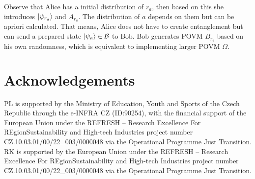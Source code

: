 \documentclass[12pt,a4paper,reqno, aps, superscriptaddress]{amsart}
\newcommand{\BB}{\ensuremath{\mathcal{B}}}
\begin{document}
Observe that Alice has a initial distribution of $r_a$, then based on this she introduces $\ket{\psi_{r_a}}$ and $A_{r_a}$. The distribution of $a$ depends on them but can be apriori calculated. That means, Alice does not have to create entanglement but can send a prepared state $\ket{\psi_{a}} \in \BB $ to Bob.
Bob generates POVM $B_{r_b}$ based on his own randomness, which is equivalent to implementing larger POVM $\Omega$. 


 
\section*{Acknowledgements}

  PL is supported by the Ministry of Education, Youth and Sports of the Czech Republic through the e-INFRA CZ (ID:90254), with the financial support of the European Union under the REFRESH – Research Excellence For REgionSustainability and
High-tech Industries project number CZ.10.03.01/00/22\_003/0000048 via the Operational Programme Just Transition.  
RK is supported by the European Union under the REFRESH – Research Excellence For REgionSustainability and
High-tech Industries project number CZ.10.03.01/00/22\_003/0000048 via the Operational Programme Just Transition.  

  
 

\end{document}
